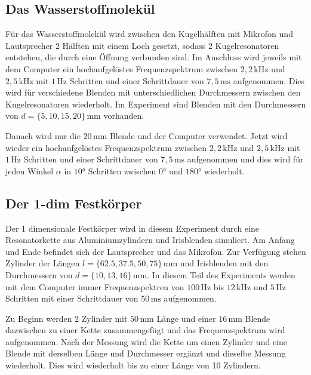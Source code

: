 \subsection{Das Wasserstoffmolekül}
\label{sec:d_H2}

Für das Wasserstoffmolekül wird zwischen den Kugelhälften mit Mikrofon und Lautsprecher 2 Hälften mit einem Loch gesetzt, sodass 2 Kugelresonatoren entstehen, die durch eine Öffnung verbunden sind. Im Anschluss wird jeweils mit dem Computer ein hochaufgelöstes Frequenzspektrum zwischen $2, \! 2 \, \mathrm{kHz}$ und $2, \! 5 \, \mathrm{kHz}$ mit $1 \, \mathrm{Hz}$ Schritten und einer Schrittdauer von $7, \! 5 \, \mathrm{ms}$ aufgenommen. Dies wird für verschiedene Blenden mit unterschiedlichen Durchmessern zwischen den Kugelresonatoren wiederholt. Im Experiment sind Blenden mit den Durchmessern von $d = \{ 5, 10, 15, 20 \} \, \mathrm{mm}$ vorhanden. \newline

Danach wird nur die $20 \, \mathrm{mm}$ Blende und der Computer verwendet. Jetzt wird wieder ein hochaufgelöstes Frequenzspektrum zwischen $2, \! 2 \, \mathrm{kHz}$ und $2, \! 5 \, \mathrm{kHz}$ mit $1 \, \mathrm{Hz}$ Schritten und einer Schrittdauer von $7, \! 5 \, \mathrm{ms}$ aufgenommen und dies wird für jeden Winkel $\alpha$ in $10°$ Schritten zwischen $0°$ und $180°$ wiederholt.

\subsection{Der 1-dim Festkörper}
\label{sec:d_fk}

Der 1 dimensionale Festkörper wird in diesem Experiment durch eine Resonatorkette aus Aluminiumzylindern und Irisblenden simuliert. Am Anfang und Ende befindet sich der Lautsprecher und das Mikrofon. Zur Verfügung stehen Zylinder der Längen $l = \{ 62.5, 37.5, 50, 75 \} \, \mathrm{mm}$ und Irisblenden mit den Durchmessern von $d = \{ 10, 13, 16 \} \, \mathrm{mm}$. In diesem Teil des Experiments werden mit dem Computer immer Frequenzspektren von $100 \, \mathrm{Hz}$ bis $12 \, \mathrm{kHz}$ und $5 \, \mathrm{Hz}$ Schritten mit einer Schrittdauer von $50 \, \mathrm{ms}$ aufgenommen. \newline

Zu Beginn werden 2 Zylinder mit $50 \, \mathrm{mm}$ Länge und einer $16 \, \mathrm{mm}$ Blende dazwischen zu einer Kette zusammengefügt und das Frequenzspektrum wird aufgenommen. Nach der Messung wird die Kette um einen Zylinder und eine Blende mit derselben Länge und Durchmesser ergänzt und dieselbe Messung wiederholt. Dies wird wiederholt bis zu einer Länge von 10 Zylindern. \newline


